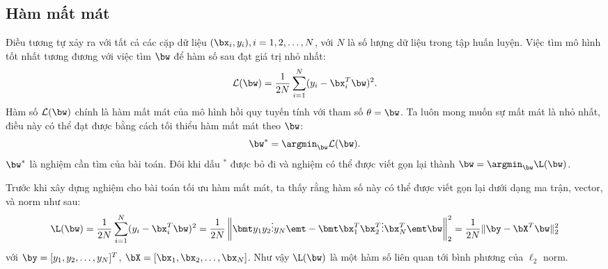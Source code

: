 \subsection{Hàm mất mát}

Điều tương tự xảy ra với tất cả các cặp dữ liệu $(\bx_i, y_i), i = 1, 2, \dots,
N $, với $N$ là số lượng dữ liệu trong tập huấn luyện. Việc tìm mô hình tốt nhất tương đương với việc tìm $\bw$ để hàm số sau
đạt giá trị nhỏ nhất:
\begin{equation}
  \label{eqn:3_2}
  \mathcal{L}(\bw) = \frac{1}{2N}\sum_{i=1}^N (y_i - \bx_i^T\bw)^2.
\end{equation}
Hàm số $\mathcal{L}(\bw)$ chính là hàm mất mát của mô hình hồi quy tuyến tính với tham số $\theta = \bw$. Ta luôn mong muốn sự
mất mát là nhỏ nhất, điều này có thể
đạt được bằng cách tối thiểu hàm mất mát theo $\bw$: 
\begin{equation}
\label{eqn:3_4}
\bw^* = \argmin_{\bw} \mathcal{L}(\bw).
\end{equation}
$\bw^*$ là nghiệm cần tìm của bài toán. Đôi khi dấu $^*$ được bỏ đi và nghiệm có thể được viết gọn lại thành $\displaystyle \bw = \argmin_{\bw}\L(\bw)$.




Trước khi xây dựng nghiệm cho bài toán tối ưu hàm mất mát, ta thấy rằng hàm
số này có thể được viết gọn lại dưới dạng ma trận, vector, và norm như sau: 
\begin{equation}
    \L(\bw) = \frac{1}{2N}\sum_{i=1}^N (y_i - \bx_i^T\bw)^2 
    = \frac{1}{2N} \left\|\bmt y_1 \\y_2 \\\vdots \\ y_N  \emt - 
    \bmt \bx_1^T \\ \bx_2^T \\ \vdots \\ \bx_N^T \emt \bw 
    \right\|_2^2 = \frac{1}{2N} \| \by - \bX^T\bw\|_2^2 
\end{equation}
với $\by = [y_1, y_2, \dots, y_N]^T$, $\bX = [\bx_1, \bx_2, \dots, \bx_N]$.
Như vậy $\L(\bw)$ là một hàm số liên quan tới bình phương của $\ell_2$ norm. 








